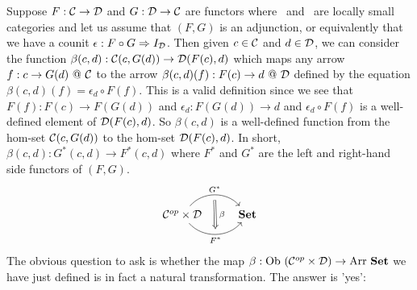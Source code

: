 Suppose $F:\mbox{$\cal C$}\to\mbox{$\cal D$}$ and $G:\mbox{$\cal D$}\to\mbox{$\cal C$}$ are functors where \Cat\ and \Dat\ 
are locally small categories and let us assume that $(F,G)$ is an adjunction, 
or equivalently that we have a counit $\epsilon:F\circ G\Rightarrow I_{\cal D}$. 
Then given $c\in\mbox{$\cal C$}$ and $d\in\mbox{$\cal D$}$, we can consider the function
$\beta(c,d):\mbox{$\cal C$}(c,G(d))\to\mbox{$\cal D$}(F(c),d)$ which maps any arrow $f:c\to G(d)\ @\ 
\Cat$ to the arrow $\beta(c,d)(f):F(c)\to d\ @\ \mbox{$\cal D$}$ defined by the equation
$\beta(c,d)(f)=\epsilon_{d}\circ F(f)$. This is a valid definition since we see 
that
$F(f):F(c)\to F(G(d))$ and $\epsilon_{d}:F(G(d))\to d$ and $\epsilon_{d}\circ 
F(f)$ is a well-defined element of $\mbox{$\cal D$}(F(c),d)$. So $\beta(c,d)$ is a 
well-defined function from the hom-set $\mbox{$\cal C$}(c,G(d))$ to the hom-set 
$\mbox{$\cal D$}(F(c),d)$. In short, $\beta(c,d):G^{*}(c,d)\to F^{*}(c,d)$ 
where $F^{*}$ and $G^{*}$
are the left and right-hand side functors of $(F,G)$. 
    \[
        \begin{tikzcd}
            \Cop\times\Dat \arrow[r, "G^{*}", bend left  = 50, ""{name=U, below}]
                 \arrow[r, swap, "F^{*}", bend right = 50, ""{name=D, above}]
              & \Set
            \arrow[Rightarrow, "\,\beta", from = U, to = D]
        \end{tikzcd}
    \]
The obvious question to ask is whether the map $\beta:\mbox{\rm Ob}\ (\mbox{${\cal C}^{op}$}\times\mbox{$\cal D$})
\to\mbox{\rm Arr}\ \mbox{\bf Set}$ we have just defined is in fact a natural transformation.
The answer is 'yes':

